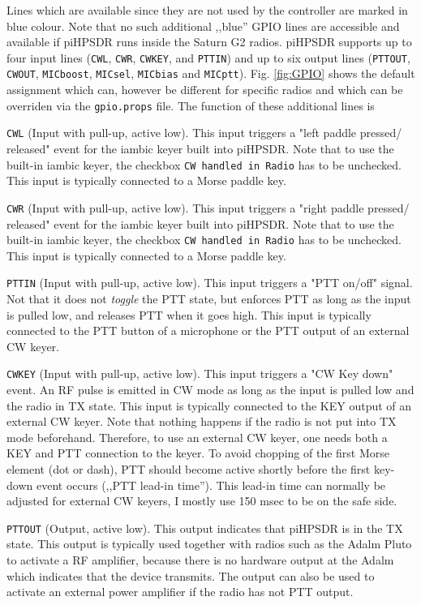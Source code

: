 \documentclass[12pt]{book}
\def\rett#1{\texttt{\color{red}#1}}
\def\bltt#1{\texttt{\color{blue}#1}}
\def\pH{pi\-HPSDR\xspace}
\begin{document}
Lines which are available since they are not used by the controller are marked in blue colour.
{\color{red} Note that no such additional ,,blue'' GPIO
 lines are accessible and available if \pH runs inside the Saturn G2 radios.}
\pH supports up to four input lines (\texttt{CWL}, \texttt{CWR}, \texttt{CWKEY}, and \texttt{PTTIN})
and up to six output lines (\texttt{PTTOUT}, \texttt{CWOUT}, \texttt{MICboost}, \texttt{MICsel}, \texttt{MICbias}
and \texttt{MICptt}). Fig. \ref{fig:GPIO} shows the default assignment which can, however be different
for specific radios and which can be overriden via the \texttt{gpio.props} file.
The function of these additional lines is

\texttt{CWL} (Input with pull-up, active low). This input triggers a "left paddle pressed/
released" event for the
iambic keyer built into \pH. Note that to use the built-in iambic keyer, the checkbox
\bltt{CW handled in Radio} has to be unchecked. This input is typically connected to
a Morse paddle key.

\rett{CWR} (Input with pull-up, active low). This input triggers a "right paddle pressed/
released" event for the
iambic keyer built into \pH. Note that to use the built-in iambic keyer, the checkbox
\bltt{CW handled in Radio} has to be unchecked. This input is typically connected to
a Morse paddle key.


\texttt{PTTIN} (Input with pull-up, active low). This input triggers a "PTT on/off" signal.
Not that it does not \textit{toggle} the PTT state, but enforces PTT as long as the input is pulled low,
and releases PTT when it goes high. This input is typically connected to the PTT button of
a microphone or the PTT output of an external CW keyer.

\texttt{CWKEY} (Input with pull-up, active low). This input triggers a "CW Key down" event. An
RF pulse is emitted in CW mode as long as the input is pulled low and the radio in TX state.
This input is typically connected to the KEY output of an external CW keyer.  Note that  nothing
happens if the radio is not put into TX mode beforehand. Therefore, to use an external CW keyer,
one needs both a KEY and PTT connection to the keyer. To avoid chopping of the first Morse element
(dot or dash), PTT should become active shortly before the first key-down event occurs (,,PTT
lead-in time''). This lead-in time can normally be adjusted for external CW keyers, I mostly use
150 msec to be on the safe side.

\texttt{PTTOUT} (Output, active low). This output indicates that \pH is in the
TX state. This output is typically used together with radios such as the Adalm Pluto to activate
a RF amplifier, because there is no hardware output at the Adalm which indicates that the device
transmits. The output can also be used to activate an external power amplifier if the radio has
not PTT output.
\end{document}
